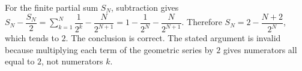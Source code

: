 For the finite partial sum $S_N$, subtraction gives $S_N-\dfrac{S_N}{2}=\sum_{k=1}^{N}\dfrac{1}{2^k}-\dfrac{N}{2^{N+1}}=1-\dfrac{1}{2^N}-\dfrac{N}{2^{N+1}}$. Therefore $S_N=2-\dfrac{N+2}{2^N}$, which tends to $\boxed2$. The conclusion is correct. The stated argument is invalid because multiplying each term of the geometric series by $2$ gives numerators all equal to $2$, not numerators $k$.

